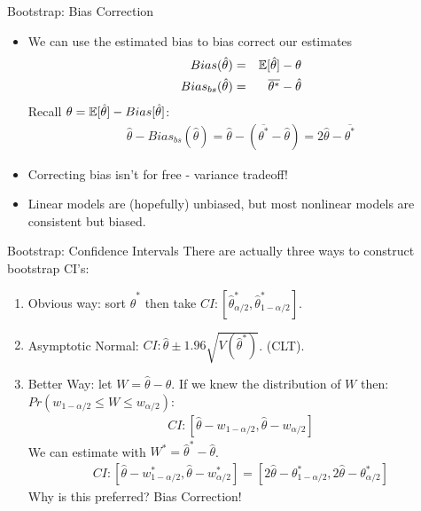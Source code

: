 \begin{frame}{Bootstrap: Bias Correction}
\begin{itemize}
\item We can use the estimated bias to \alert{bias correct} our estimates
\begin{eqnarray*}
Bias(\hat{\theta}) &=&\mathbb{E}[\hat{\theta}] - \theta \\
Bias_{bs}(\hat{\theta}) &=&\overline{\theta^{*}} -\hat{\theta}
\end{eqnarray*}
Recall $\theta = \mathbb{E}[\hat{\theta}] - Bias[\hat{\theta}]$:
\begin{eqnarray*}
\hat{\theta}- Bias_{bs}(\hat{\theta}) = \hat{\theta}-(\overline{\theta^{*}}-\hat{\theta}) = 2 \hat{\theta} - \overline{\theta^{*}}
\end{eqnarray*}
\item Correcting bias isn't for free - variance tradeoff!
\item Linear models are (hopefully) unbiased, but most nonlinear models are \alert{consistent but biased}.
\end{itemize}

\end{frame}

\begin{frame}{Bootstrap: Confidence Intervals}
There are actually three ways to construct bootstrap CI's:
\begin{enumerate}
\item Obvious way: sort  $\hat{\theta}^{*}$ then take $CI: [\hat{\theta}^{*}_{\alpha/2},\hat{\theta}^{*}_{1-\alpha/2}]$.
\item Asymptotic Normal:  $CI: \hat{\theta} \pm 1.96 \sqrt{V(\hat{\theta}^{*})}$. (CLT).
\item Better Way: let $W= \hat{\theta} -\theta$. If we knew the distribution of $W$ then: $Pr(w_{1-\alpha/2} \leq W \leq w_{\alpha/2})$:
\begin{eqnarray*}
CI: [\hat{\theta} -w_{1-\alpha/2}, \hat{\theta} -w_{\alpha/2}]
\end{eqnarray*}
We can estimate with $W^{*} = \hat{\theta}^{*} - \hat{\theta}$.
\begin{eqnarray*}
CI: [\hat{\theta} -w^*_{1-\alpha/2}, \hat{\theta} -w^*_{\alpha/2}] = [2 \hat{\theta} -\theta^*_{1-\alpha/2}, 2 \hat{\theta} -\theta^*_{\alpha/2}]
\end{eqnarray*}
Why is this preferred? Bias Correction!
\end{enumerate}

\end{frame}



